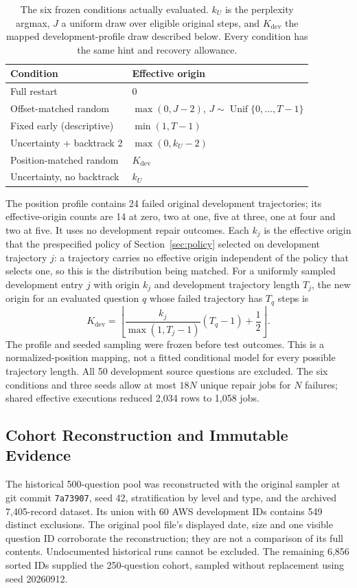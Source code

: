 \documentclass{article}
\begin{document}
\begin{table}[h]
\centering
\caption{The six frozen conditions actually evaluated. $k_U$ is the
perplexity argmax, $J$ a uniform draw over eligible original steps, and
$K_{\mathrm{dev}}$ the mapped development-profile draw described below.
Every condition has the same hint and recovery allowance.}
\label{tab:budget_protocol}
\small
\begin{tabular}{@{}ll@{}}
\toprule
Condition & Effective origin \\
\midrule
Full restart & $0$ \\
Offset-matched random & $\max(0,J-2)$, $J\sim\operatorname{Unif}\{0,\ldots,T-1\}$ \\
Fixed early (descriptive) & $\min(1,T-1)$ \\
Uncertainty + backtrack 2 & $\max(0,k_U-2)$ \\
Position-matched random & $K_{\mathrm{dev}}$ \\
Uncertainty, no backtrack & $k_U$ \\
\bottomrule
\end{tabular}
\end{table}

The position profile contains 24 failed original development trajectories;
its effective-origin counts are 14 at zero, two at one, five at three, one
at four and two at five. It uses no development repair outcomes. Each $k_j$ is
the effective origin that the prespecified policy of Section~\ref{sec:policy}
selected on development trajectory $j$: a trajectory carries no effective
origin independent of the policy that selects one, so this is the distribution
being matched. For a uniformly sampled development entry $j$ with origin $k_j$
and development trajectory length $T_j$, the new origin for an evaluated
question $q$ whose failed trajectory has $T_q$ steps is
\begin{equation}
 K_{\mathrm{dev}}=\left\lfloor
 \frac{k_j}{\max(1,T_j-1)}(T_q-1)+\frac12\right\rfloor.
\end{equation}
The profile and seeded sampling were frozen before test outcomes. This is
a normalized-position mapping, not a fitted conditional model for every
possible trajectory length. All 50 development source questions are excluded.
The six conditions and three seeds allow at most $18N$ unique repair jobs
for $N$ failures; shared effective executions reduced 2,034 rows to 1,058 jobs.

\subsection{Cohort Reconstruction and Immutable Evidence}
The historical 500-question pool was reconstructed with the original
sampler at git commit \texttt{7a73907}, seed 42, stratification by level and
type, and the archived 7,405-record dataset. Its union with 60 AWS development
IDs contains 549 distinct exclusions. The original pool file's displayed
date, size and one visible question ID corroborate the reconstruction;
they are not a comparison of its full contents. Undocumented historical
runs cannot be excluded. The remaining 6,856 sorted IDs supplied the
250-question cohort, sampled without replacement using seed 20260912.
\end{document}
